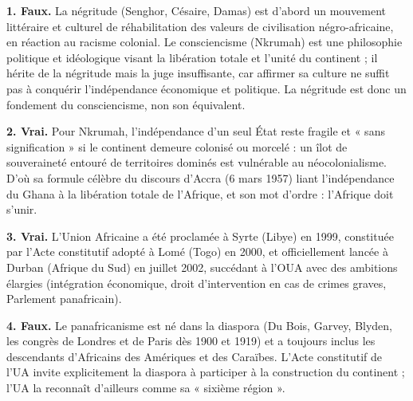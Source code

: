 \documentclass[11pt]{article}
\begin{document}
\begin{corrige}

\textbf{1. Faux.} La négritude (Senghor, Césaire, Damas) est d'abord un mouvement littéraire et culturel de réhabilitation des valeurs de civilisation négro-africaine, en réaction au racisme colonial. Le consciencisme (Nkrumah) est une philosophie politique et idéologique visant la libération totale et l'unité du continent ; il hérite de la négritude mais la juge insuffisante, car affirmer sa culture ne suffit pas à conquérir l'indépendance économique et politique. La négritude est donc un fondement du consciencisme, non son équivalent.

\textbf{2. Vrai.} Pour Nkrumah, l'indépendance d'un seul État reste fragile et « sans signification » si le continent demeure colonisé ou morcelé : un îlot de souveraineté entouré de territoires dominés est vulnérable au néocolonialisme. D'où sa formule célèbre du discours d'Accra (6 mars 1957) liant l'indépendance du Ghana à la libération totale de l'Afrique, et son mot d'ordre : l'Afrique doit s'unir.

\textbf{3. Vrai.} L'Union Africaine a été proclamée à Syrte (Libye) en 1999, constituée par l'Acte constitutif adopté à Lomé (Togo) en 2000, et officiellement lancée à Durban (Afrique du Sud) en juillet 2002, succédant à l'OUA avec des ambitions élargies (intégration économique, droit d'intervention en cas de crimes graves, Parlement panafricain).

\textbf{4. Faux.} Le panafricanisme est né dans la diaspora (Du Bois, Garvey, Blyden, les congrès de Londres et de Paris dès 1900 et 1919) et a toujours inclus les descendants d'Africains des Amériques et des Caraïbes. L'Acte constitutif de l'UA invite explicitement la diaspora à participer à la construction du continent ; l'UA la reconnaît d'ailleurs comme sa « sixième région ».
\end{corrige}
\end{document}
